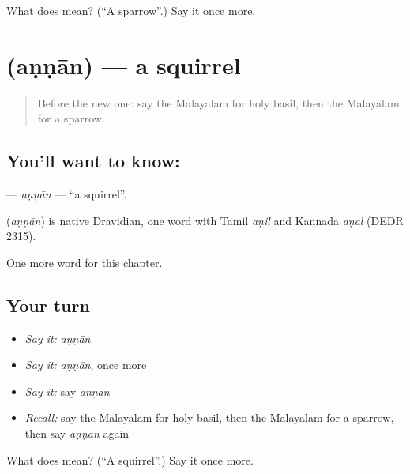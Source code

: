 \begin{tcolorbox}[breakable,colback=teal!4,colframe=teal!35!black,title={Before you move on}]
What does  mean? (\textquotedblleft{}A sparrow\textquotedblright{}.) Say it once more.
\end{tcolorbox}
\section[\texorpdfstring{\ml{അണ്ണാൻ} (aṇṇān)}{അണ്ണാൻ (aṇṇān)}]{ (aṇṇān) — a squirrel}

\label{lesson:ML-C254-annan}



\begin{quote}
Before the new one: say the Malayalam for holy basil, then the Malayalam for a sparrow.
\end{quote}

\subsection*{You'll want to know: }
\textbf{} — \emph{aṇṇān} — \textquotedblleft{}a squirrel\textquotedblright{}.

\begin{cousinweb}
\textbf{} (\emph{aṇṇān}) is native Dravidian, one word with Tamil \emph{aṇil} and Kannada \emph{aṇal} (DEDR 2315).
\end{cousinweb}

\begin{grammarlens}[title={What you've built}]
One more word for this chapter.
\end{grammarlens}

\subsection*{Your turn}
\begin{itemize}
\raggedright
  \item \emph{Say it:} \emph{aṇṇān}
  \item \emph{Say it:} \emph{aṇṇān}, once more
  \item \emph{Say it:} say \emph{aṇṇān}
  \item \emph{Recall:} say the Malayalam for holy basil, then the Malayalam for a sparrow, then say \emph{aṇṇān} again
\end{itemize}

\begin{tcolorbox}[breakable,colback=teal!4,colframe=teal!35!black,title={Before you move on}]
What does  mean? (\textquotedblleft{}A squirrel\textquotedblright{}.) Say it once more.
\end{tcolorbox}
